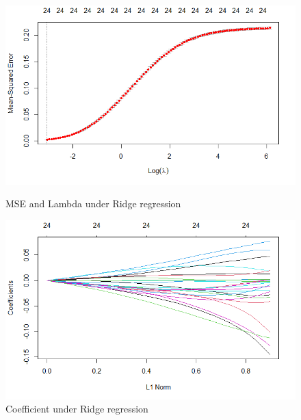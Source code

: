 \documentclass[a4paper, 11pt]{article}
\begin{document}
\begin{figure}[H]
	\centering
	\begin{minipage}[b]{0.4\textwidth}
	\includegraphics[width=\textwidth]{figure1.png}
	\caption{MSE and Lambda under Ridge regression }
\end{minipage}
	\begin{minipage}[b]{0.4\textwidth}
	\includegraphics[width=\textwidth]{figure3.png}
	\caption{Coefficient under Ridge regression }
\end{minipage}
\end{figure}
\end{document}
